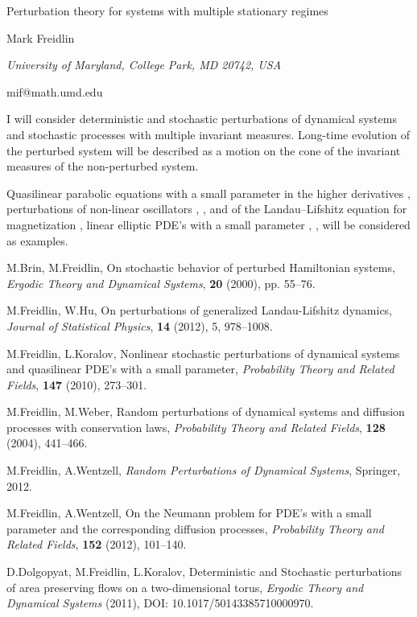 \documentclass[10pt,a4paper]{article}
\begin{document}
\begin{center}

{\Large Perturbation theory for systems with multiple stationary regimes}

\bigskip

{\sc Mark Freidlin}

{\small\it University of Maryland, College Park, MD 20742, USA}

{\small\rm mif@math.umd.edu}

\end{center}

\bigskip

I 
will 
consider 
deterministic 
and 
stochastic 
perturbations 
of 
dynamical 
systems 
and 
stochastic 
processes 
with 
multiple 
invariant 
measures. 
Long-time 
evolution 
of 
the 
perturbed 
system 
will 
be 
described 
as 
a 
motion 
on 
the 
cone 
of 
the 
invariant 
measures 
of 
the 
non-perturbed 
system. 


Quasilinear 
parabolic 
equations 
with 
a 
small 
parameter 
in 
the 
higher 
derivatives 
\cite{FK10}, 
perturbations 
of 
non-linear 
oscillators 
\cite{FWen12b}, 
\cite{BF00}, 
and 
of 
the 
Landau--Lifshitz 
equation 
for 
magnetization 
\cite{FH12}, 
linear 
elliptic 
PDE's 
with 
a 
small 
parameter 
\cite{FWeb04}, 
\cite{FW12},
\cite{FWen12b}
will 
be 
considered 
as 
examples. 

\begin{thebibliography}{6}
M.Brin, M.Freidlin, 
On stochastic behavior of perturbed Hamiltonian systems, 
\emph{Ergodic Theory and Dynamical Systems}, 
\textbf{20} (2000), 
pp. 
55--76.


M.Freidlin, W.Hu, 
On perturbations of generalized Landau-Lifshitz dynamics, 
\emph{Journal of Statistical Physics}, 
\textbf{14} (2012), 
5, 
978--1008.


M.Freidlin, L.Koralov, 
Nonlinear stochastic perturbations of dynamical systems 
and quasilinear PDE's with a small parameter, 
\emph{Probability Theory and Related Fields}, 
\textbf{147} (2010), 
273--301.


M.Freidlin, M.Weber, Random perturbations of dynamical 
systems and diffusion processes with conservation laws, 
\emph{Probability Theory and Related Fields}, 
\textbf{128} (2004), 
441--466.


M.Freidlin, A.Wentzell, 
\emph{Random Perturbations of Dynamical Systems}, 
Springer, 
2012. 


M.Freidlin, A.Wentzell,
On the Neumann problem for PDE's with 
a small parameter and the corresponding diffusion processes, 
\emph{Probability Theory and Related Fields}, 
\textbf{152} (2012), 
101--140.

D.Dolgopyat, M.Freidlin, L.Koralov, 
Deterministic and Stochastic perturbations of area preserving 
flows on a two-dimensional torus, 
\emph{Ergodic Theory and Dynamical Systems}
(2011), 
DOI: 10.1017/50143385710000970. 
\end{thebibliography}
\end{document}
